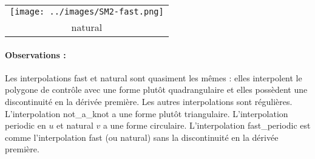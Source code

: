 \documentclass[11pt,a4paper]{article}
\begin{document}
\begin{center}
\begin{tabular}{|c|}
\hline
\texttt{[image: ../images/SM2-fast.png]} \\
natural \\
\hline
\end{tabular}
\end{center}


\paragraph{Observations :} Les interpolations fast et natural sont quasiment les mêmes : elles interpolent
le polygone de contrôle avec une forme plutôt quadrangulaire et elles possèdent une discontinuité en la dérivée
première. Les autres interpolations sont régulières. L'interpolation not\_a\_knot a une forme plutôt triangulaire.
L'interpolation periodic en $u$ et natural $v$ a une forme circulaire. L'interpolation fast\_periodic est comme
l'interpolation fast (ou natural) sans la discontinuité en la dérivée première.

 \pagebreak
 
\end{document}
